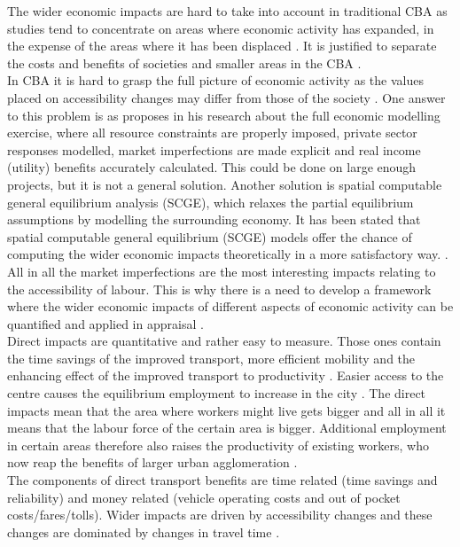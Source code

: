 \documentclass[a4paper, 12 pt]{article}   	%
\begin{document}
The wider economic impacts are hard to take into account in traditional CBA as studies tend to concentrate on areas where economic activity has expanded, in the expense of the areas where it has been displaced \citep{venables2017}. It is justified to separate the costs and benefits of societies and smaller areas in the CBA \citep{laakso}. \\

In CBA it is hard to grasp the full picture of economic activity as the values placed on accessibility changes may differ from those of the society \citep{andersson}. One answer to this problem is as \cite{venables2017} proposes in his research about the full economic modelling exercise, where all resource constraints are properly imposed, private sector responses modelled, market imperfections are made explicit and real income (utility) benefits accurately calculated. This could be done on large enough projects, but it is not a general solution. Another solution is spatial computable general equilibrium analysis (SCGE), which relaxes the partial equilibrium assumptions by modelling the surrounding economy. It has been stated that spatial computable general equilibrium (SCGE) models offer the chance of computing the wider economic impacts theoretically in a more satisfactory way. \citep{andersson}.  All in all the market imperfections are the most interesting impacts relating to the accessibility of labour. This is why there is a need to develop a framework where the wider economic impacts of different aspects of economic activity can be quantified and applied in appraisal \citep{venables2017}. \\


Direct impacts are quantitative and rather easy to measure. Those ones contain the time savings of the improved transport, more efficient mobility and the enhancing effect of the improved transport to productivity \citep{laakso}. Easier access to the centre causes the equilibrium employment to increase in the city \citep{venables2007}. The direct impacts mean that the area where workers might live gets bigger and all in all it means that the labour force of the certain area is bigger. Additional employment in certain areas therefore also raises the productivity of existing workers, who now reap the benefits of larger urban agglomeration \citep{venables2007}. \\

The components of direct transport benefits are time related (time savings and reliability) and money related (vehicle operating costs and out of pocket costs/fares/tolls). Wider impacts are driven by accessibility changes and these changes are dominated by changes in travel time \citep{mackie}. \\
\end{document}
